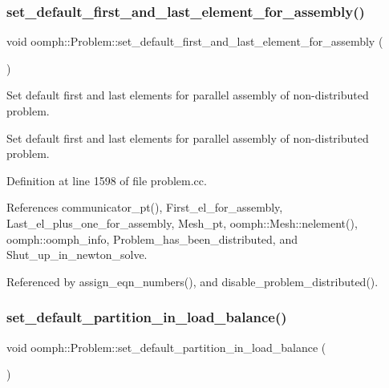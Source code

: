\subsubsection{\texorpdfstring{set\+\_\+default\+\_\+first\+\_\+and\+\_\+last\+\_\+element\+\_\+for\+\_\+assembly()}{set\_default\_first\_and\_last\_element\_for\_assembly()}}
{\footnotesize\ttfamily void oomph\+::\+Problem\+::set\+\_\+default\+\_\+first\+\_\+and\+\_\+last\+\_\+element\+\_\+for\+\_\+assembly (\begin{DoxyParamCaption}{ }\end{DoxyParamCaption})}



Set default first and last elements for parallel assembly of non-\/distributed problem. 

Set default first and last elements for parallel assembly of non-\/distributed problem. 

Definition at line 1598 of file problem.\+cc.



References communicator\+\_\+pt(), First\+\_\+el\+\_\+for\+\_\+assembly, Last\+\_\+el\+\_\+plus\+\_\+one\+\_\+for\+\_\+assembly, Mesh\+\_\+pt, oomph\+::\+Mesh\+::nelement(), oomph\+::oomph\+\_\+info, Problem\+\_\+has\+\_\+been\+\_\+distributed, and Shut\+\_\+up\+\_\+in\+\_\+newton\+\_\+solve.



Referenced by assign\+\_\+eqn\+\_\+numbers(), and disable\+\_\+problem\+\_\+distributed().

\mbox{\label{classoomph_1_1Problem_a23e641f64f436d4911c53c0f5c7ff239}} 
\subsubsection{\texorpdfstring{set\+\_\+default\+\_\+partition\+\_\+in\+\_\+load\+\_\+balance()}{set\_default\_partition\_in\_load\_balance()}}
{\footnotesize\ttfamily void oomph\+::\+Problem\+::set\+\_\+default\+\_\+partition\+\_\+in\+\_\+load\+\_\+balance (\begin{DoxyParamCaption}{ }\end{DoxyParamCaption})\hspace{0.3cm}{\ttfamily [inline]}}



